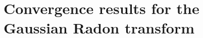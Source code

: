 \documentclass{amsart}
\theoremstyle{remark}
\numberwithin{equation}{section}
\newcommand{\tc}{\textcolor{blue}}
\begin{document}


\section{Convergence results for the Gaussian Radon transform}
\end{document}
